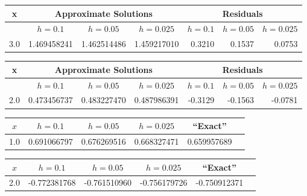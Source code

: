 \bigskip

 \quad
{\small
{}
\begin{tabular}{|c|r|r|r|r|r|r|}\hline
x&\multicolumn{3}{c|}{Approximate Solutions}&
\multicolumn{3}{c|}{Residuals}\\\hline
&
\multicolumn{1}{|c|}{$h=0.1$}&
\multicolumn{1}{|c|}{$h=0.05$}&
\multicolumn{1}{|c|}{$h=0.025$}&
\multicolumn{1}{|c|}{$h=0.1$}&
\multicolumn{1}{|c|}{$h=0.05$}&
\multicolumn{1}{|c|}{$h=0.025$}\\ \hline
3.0 & 1.469458241 & 1.462514486 & 1.459217010 & 0.3210 & 0.1537 & 0.0753 \\
\hline
\end{tabular}}

\bigskip

 \quad
{\small
{}
\begin{tabular}{|c|r|r|r|r|r|r|}\hline
x&\multicolumn{3}{c|}{Approximate Solutions}&
\multicolumn{3}{c|}{Residuals}\\\hline
&
\multicolumn{1}{|c|}{$h=0.1$}&
\multicolumn{1}{|c|}{$h=0.05$}&
\multicolumn{1}{|c|}{$h=0.025$}&
\multicolumn{1}{|c|}{$h=0.1$}&
\multicolumn{1}{|c|}{$h=0.05$}&
\multicolumn{1}{|c|}{$h=0.025$}\\ \hline
2.0 & 0.473456737 & 0.483227470 & 0.487986391 &-0.3129 & -0.1563 & -0.0781 \\
\hline
\end{tabular}}

\bigskip

     \quad
{\small
{}
\begin{tabular}{|c|r|r|r|r|r|}
\hline
\multicolumn{1}{|c|}{$x$}&
\multicolumn{1}{|c|}{$h=0.1$}&
\multicolumn{1}{|c|}{$h=0.05$}&
\multicolumn{1}{|c|}{$h=0.025$}&
\multicolumn{1}{|c|}{``Exact''}\\ \hline
1.0 & 0.691066797 & 0.676269516 & 0.668327471 & 0.659957689 \\
\hline
\end{tabular}}

\bigskip
{}          \quad
{\small
{}
\begin{tabular}{|c|r|r|r|r|r|}
\hline
\multicolumn{1}{|c|}{$x$}&
\multicolumn{1}{|c|}{$h=0.1$}&
\multicolumn{1}{|c|}{$h=0.05$}&
\multicolumn{1}{|c|}{$h=0.025$}&
\multicolumn{1}{|c|}{``Exact''}\\ \hline
2.0 & -0.772381768 & -0.761510960 & -0.756179726 & -0.750912371 \\
\hline
\end{tabular}}

